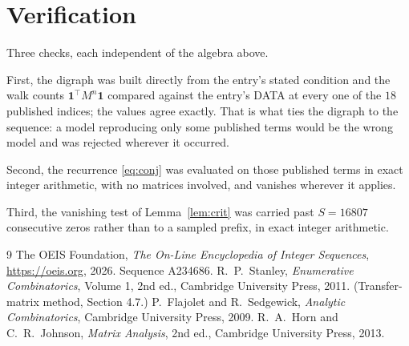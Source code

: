 \documentclass[11pt,a4paper]{article}
\theoremstyle{plain}
\theoremstyle{definition}
\begin{document}
\section{Verification}

Three checks, each independent of the algebra above.

First, the digraph was built directly from the entry's stated condition and the walk counts
$\mathbf{1}^{\!\top}M^{n}\mathbf{1}$ compared against the entry's DATA at every one of
the $18$ published indices; the values agree exactly. That is what ties the digraph to
the sequence: a model reproducing only some published terms would be the wrong model and
was rejected wherever it occurred.

Second, the recurrence \eqref{eq:conj} was evaluated on those published terms in exact
integer arithmetic, with no matrices involved, and vanishes wherever it applies.

Third, the vanishing test of Lemma~\ref{lem:crit} was carried past $S=16807$ consecutive
zeros rather than to a sampled prefix, in exact integer arithmetic.

\begin{thebibliography}{9}
 The OEIS Foundation, \emph{The On-Line Encyclopedia of Integer
Sequences}, \url{https://oeis.org}, 2026. Sequence A234686.
 R.~P.~Stanley, \emph{Enumerative Combinatorics}, Volume 1, 2nd ed.,
Cambridge University Press, 2011. (Transfer-matrix method, Section 4.7.)
 P.~Flajolet and R.~Sedgewick, \emph{Analytic Combinatorics}, Cambridge
University Press, 2009.
 R.~A.~Horn and C.~R.~Johnson, \emph{Matrix Analysis}, 2nd ed., Cambridge
University Press, 2013.
\end{thebibliography}
\end{document}
